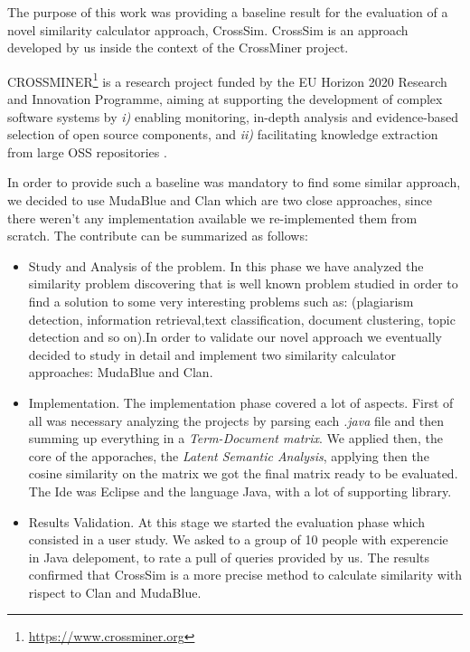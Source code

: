 The purpose of this work was providing a baseline result for the evaluation of a novel similarity calculator approach, CrossSim.
CrossSim is an approach developed by us inside the context of the CrossMiner project.

CROSSMINER\footnote{\url{https://www.crossminer.org}} is a research project funded by the EU Horizon 2020 Research and Innovation Programme, aiming at supporting the development of complex software systems by \textit{i)} enabling monitoring, in-depth analysis and evidence-based selection of open source components, and \textit{ii)} facilitating knowledge extraction from large OSS repositories \cite{10.1007/978-3-319-74730-9_33}. 

In order to provide such a baseline was mandatory to find some similar approach, we decided to use MudaBlue and Clan which are two close approaches, since there weren't any implementation available we re-implemented them from scratch. The contribute can be summarized as follows:

\begin{itemize}
	\item Study and Analysis of the problem. In this phase we have analyzed the similarity problem discovering that is well known problem studied in order to find a solution to some very interesting problems such as: (plagiarism detection, information retrieval,text classification, document clustering, topic detection and so on).In order to validate our novel approach we eventually decided to study in detail and implement two similarity calculator approaches: MudaBlue and Clan.
	\item Implementation. The implementation phase covered a lot of aspects. First of all was necessary analyzing the projects by parsing each \emph{.java} file and then summing up everything in a \emph{Term-Document matrix}. We applied then, the core of the apporaches, the \emph{Latent Semantic Analysis}, applying then the cosine similarity on the matrix we got the final matrix ready to be evaluated. The Ide was Eclipse and the language Java, with a lot of supporting library.
	\item Results Validation. At this stage we started the evaluation phase which consisted in a user study. We asked to a group of 10 people with experencie in Java delepoment, to rate a pull of queries provided by us. The results confirmed that CrossSim is a more precise method to calculate similarity with rispect to Clan and MudaBlue.
\end{itemize}

